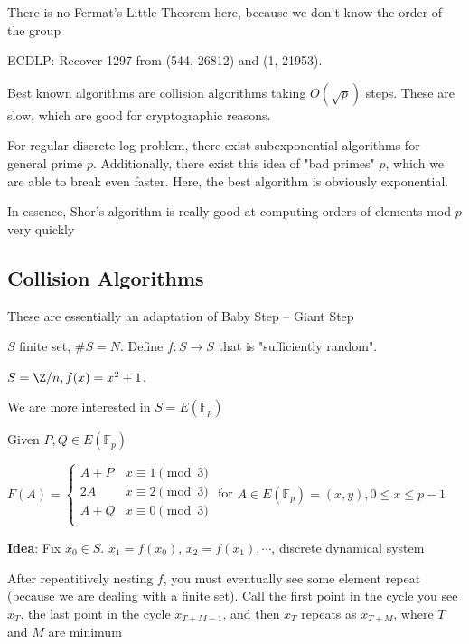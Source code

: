 \documentclass[twoside, 10pt]{article}
\newcommand{\F}{\mathbb{F}}
\begin{document}
\begin{rmk}
    There is no Fermat's Little Theorem here, because we don't know the order of the group
\end{rmk}

ECDLP: Recover 1297 from (544, 26812) and (1, 21953).

Best known algorithms are collision algorithms taking $O(\sqrt{p})$ steps. These are slow, which are good for cryptographic reasons.

\begin{rmk}
    For regular discrete log problem, there exist subexponential algorithms for general prime $p$. Additionally, there exist this idea of "bad primes" $p$, which we are able to break even faster. Here, the best algorithm is obviously exponential.
\end{rmk}

\begin{rmk}
    In essence, Shor's algorithm is really good at computing orders of elements mod $p$ very quickly
\end{rmk}

\subsection{Collision Algorithms} These are essentially an adaptation of Baby Step -- Giant Step

$S$ finite set, $\#S = N$. Define $f : S \to S$ that is "sufficiently random".

\begin{exm*}
    $S  = \Z/n, f(x) = x^2 + 1$.
\end{exm*}

We are more interested in $S = E(\F_p)$

Given $P, Q \in E(\F_p)$

$F(A) = \begin{cases}
    A + P & x \equiv 1\pmod{3}\\
    2A & x \equiv 2\pmod{3}\\
    A + Q & x \equiv 0\pmod{3}\\
\end{cases}$ \hspace{1em} for $A \in E(\F_p) = (x, y), 0 \leq x \leq p-1$

\textbf{Idea}: Fix $x_0 \in S$. $x_1 = f(x_0)$, $x_2 = f(x_1), \cdots$, discrete dynamical system

After repeatitively nesting $f$, you must eventually see some element repeat (because we are dealing with a finite set). Call the first point in the cycle you see $x_T$, the last point in the cycle $x_{T + M - 1}$, and then $x_T$ repeats as $x_{T + M}$, where $T$ and $M$ are minimum
\end{document}
